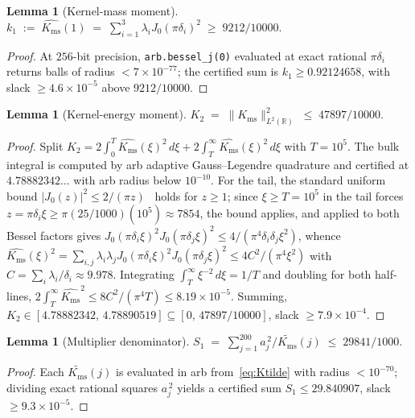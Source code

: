 \documentclass[11pt, letterpaper]{article}
\theoremstyle{plain}
\newtheorem{lemma}[theorem]{Lemma}
\theoremstyle{definition}
\newcommand{\R}{\mathbb{R}}
\newcommand{\Kms}{K_{\mathrm{ms}}}
\begin{document}
\begin{lemma}[Kernel-mass moment]
\label{lem:k1}
\(
  k_1 \;:=\; \widehat{\Kms}(1)
  \;=\; \sum_{i=1}^{3}\lambda_i J_0(\pi\delta_i)^2
  \;\ge\; 9212/10000.
\)
\end{lemma}

\begin{proof}
At $256$-bit precision, \texttt{arb.bessel\_j(0)} evaluated at exact
rational $\pi\delta_i$ returns balls of radius $<7\times 10^{-77}$;
the certified sum is $k_1\ge 0.92124658$, with slack
$\ge 4.6\times 10^{-5}$ above $9212/10000$.
\end{proof}

\begin{lemma}[Kernel-energy moment]
\label{lem:K2}
\(
  K_2 \;=\; \|\Kms\|_{L^2(\R)}^{2}
  \;\le\; 47897/10000.
\)
\end{lemma}

\begin{proof}
Split
$K_2 = 2\int_0^{T}\widehat{\Kms}(\xi)^2\,d\xi
+ 2\int_{T}^{\infty}\widehat{\Kms}(\xi)^2\,d\xi$ with $T=10^{5}$.
The bulk integral is computed by arb adaptive Gauss--Legendre
quadrature and certified at $4.78882342\ldots$ with arb radius
below $10^{-10}$.  For the tail, the standard uniform bound
$|J_0(z)|^2\le 2/(\pi z)$~\cite[\S 7.21]{Watson} holds for $z\ge 1$;
since $\xi\ge T=10^{5}$ in the tail forces $z=\pi\delta_i\xi\ge
\pi(25/1000)(10^{5})\approx 7854$, the bound applies, and applied to
both Bessel factors gives
$J_0(\pi\delta_i\xi)^2 J_0(\pi\delta_j\xi)^2
\le 4/(\pi^4\delta_i\delta_j\xi^2)$, whence
$\widehat{\Kms}(\xi)^2 = \sum_{i,j}\lambda_i\lambda_j
   J_0(\pi\delta_i\xi)^2 J_0(\pi\delta_j\xi)^2
\le 4C^2/(\pi^4\xi^2)$ with
$C=\sum_i\lambda_i/\delta_i\approx 9.978$.  Integrating
$\int_T^\infty \xi^{-2}\,d\xi = 1/T$ and doubling for both half-lines,
$2\int_T^\infty\widehat{\Kms}^2 \le 8C^2/(\pi^4 T) \le 8.19\times 10^{-5}$.
Summing,
$K_2\in[4.78882342,\,4.78890519]\subseteq[0,\,47897/10000]$, slack
$\ge 7.9\times 10^{-4}$.
\end{proof}

\begin{lemma}[Multiplier denominator]
\label{lem:S1}
\(
  S_1 \;=\;
  \sum_{j=1}^{200} a_j^{\,2}/\widetilde{\Kms}(j)
  \;\le\; 29841/1000.
\)
\end{lemma}

\begin{proof}
Each $\widetilde{\Kms}(j)$ is evaluated in arb from~\eqref{eq:Ktilde}
with radius $<10^{-70}$; dividing exact rational squares $a_j^{\,2}$
yields a certified sum $S_1\le 29.840907$, slack
$\ge 9.3\times 10^{-5}$.
\end{proof}
\end{document}
